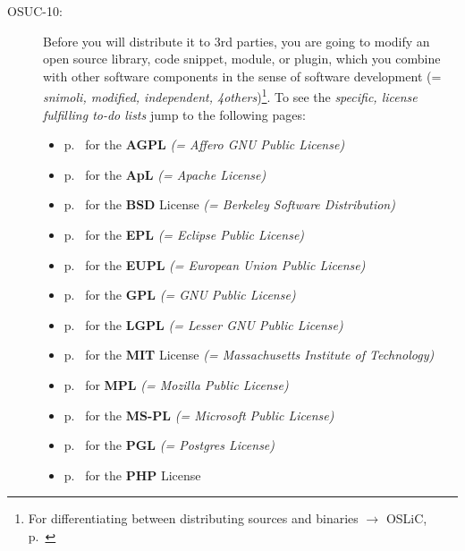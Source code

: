 \begin{description}
\item[OSUC-10:]\label{OSUC-10-DEF} Before you will distribute it to 3rd parties,
you are going to modify an open source library, code snippet, module, or plugin,
which you combine with other software components in the sense of software
development (= \textit{snimoli, modified, independent, 4others})\footnote{For
differentiating between distributing sources and binaries $\rightarrow$ OSLiC,
p.\ \pageref{sec:SourceBinaryDifference}}. To see the \textit{specific, license
fulfilling to-do lists} jump to the following pages:
  \begin{itemize}
    \item p.\ \pageref{OSUC-10-AGPL} for the \textbf{AGPL}
      \textit{(= Affero GNU Public License)} 
    \item p.\ \pageref{OSUC-10-Apache20} for the \textbf{ApL}
      \textit{(= Apache License)}
    \item p.\ \pageref{OSUC-10-BSD} for the \textbf{BSD} License
      \textit{(= Berkeley Software Distribution)}
    \item p.\ \pageref{OSUC-10-EPL} for the \textbf{EPL}
      \textit{(= Eclipse Public License)}     
    \item p.\ \pageref{OSUC-10-EUPL} for the \textbf{EUPL}
      \textit{(= European Union Public License)} 
    \item p.\ \pageref{OSUC-10-GPL} for the \textbf{GPL}
       \textit{(= GNU Public License)} 
    \item p.\ \pageref{OSUC-10-LGPL} for the \textbf{LGPL}
      \textit{(= Lesser GNU Public License)}           
    \item p.\ \pageref{OSUC-10-MIT} for the \textbf{MIT} License
       \textit{(= Massachusetts Institute of Technology)} 
    \item p.\ \pageref{OSUC-10-MPL} for \textbf{MPL}
      \textit{(= Mozilla Public License)}     
    \item p.\ \pageref{OSUC-10-MS-PL} for the \textbf{MS-PL}
      \textit{(= Microsoft Public License)} 
    \item p.\ \pageref{OSUC-10-PGL} for the \textbf{PGL}
      \textit{(= Postgres License)} 
    \item p.\ \pageref{OSUC-10-PHP} for the \textbf{PHP} License 
  \end{itemize}

\end{description}

%
